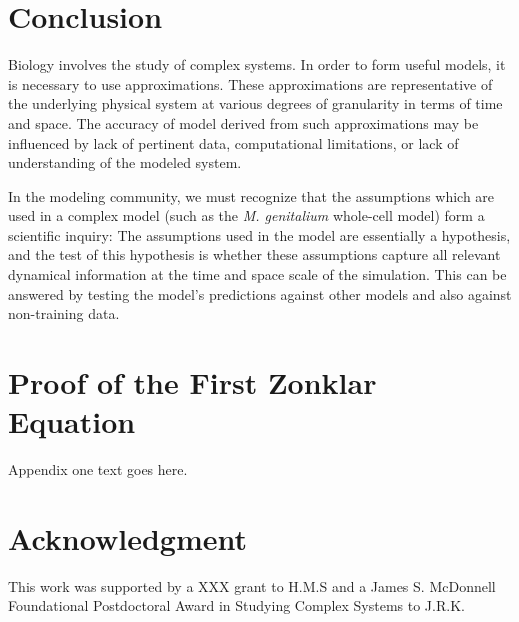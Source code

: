 \documentclass[journal,transmag]{IEEEtran}
\begin{document}




\section{Conclusion}
Biology involves the study of complex systems.
In order to form useful models, it is necessary to use approximations.
These approximations are representative of the underlying physical
system at various degrees of granularity in terms of time and space.
The accuracy of model derived from such approximations may be influenced
by lack of pertinent data, computational limitations, or lack of
understanding of the modeled system.

In the modeling community, we must recognize that the assumptions which
are used in a complex model (such as the \textit{M. genitalium} whole-cell model)
form a scientific inquiry: The assumptions used in the model are
essentially a hypothesis, and the test of this hypothesis is whether
these assumptions capture all relevant dynamical information
at the time and space scale of the simulation.
This can be answered by testing the model's predictions against other
models and also against non-training data.


\appendices
\section{Proof of the First Zonklar Equation}
Appendix one text goes here.

\section*{Acknowledgment}
This work was supported by a XXX grant to H.M.S and a James S. McDonnell Foundational Postdoctoral Award in Studying Complex Systems to J.R.K.

\ifCLASSOPTIONcaptionsoff
  \newpage
\fi
\end{document}
